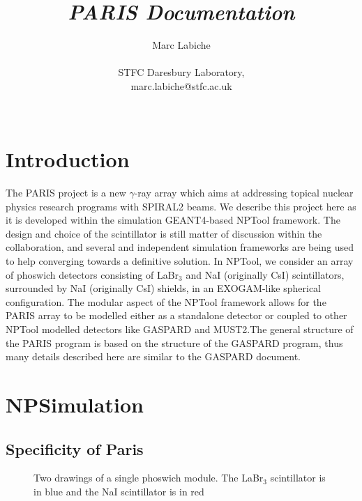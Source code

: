 \documentclass[a4paper,12pt]{article}
\begin{document}
\title{\emph{PARIS Documentation}}
\author{Marc Labiche\\ \\
 STFC Daresbury Laboratory,\\
 marc.labiche@stfc.ac.uk\\ \\} 

\maketitle 
\pagebreak
\tableofcontents
\pagebreak


\section{Introduction}
The PARIS project is a new $\gamma$-ray array which aims at addressing topical nuclear 
physics research programs with SPIRAL2 beams.
We describe this project here as it is developed within the simulation GEANT4-based 
NPTool framework. The design and choice of the scintillator is still matter of 
discussion within the collaboration, and several and independent simulation frameworks 
are being used to help converging towards a definitive solution. In NPTool, we consider 
an array of phoswich detectors consisting of LaBr$_{3}$ and NaI (originally CsI) 
scintillators, surrounded by NaI (originally CsI) shields, in an EXOGAM-like spherical 
configuration. The modular 
aspect of the NPTool framework allows for the PARIS array to be modelled either as a 
standalone detector or coupled to other NPTool modelled detectors like GASPARD and 
MUST2.The general structure of the PARIS program is based on the structure of the 
GASPARD program, thus many details described here are similar to the GASPARD document.

\section{NPSimulation}
\subsection{Specificity of Paris}

\begin{figure*}[ht]
\begin{center}
\end{center}
\caption{Two drawings of a single phoswich module. The LaBr$_{3}$ scintillator is in blue 
and the NaI scintillator is in red } 
\label{fig:phoswich1}
\end{figure*}
\end{document}
